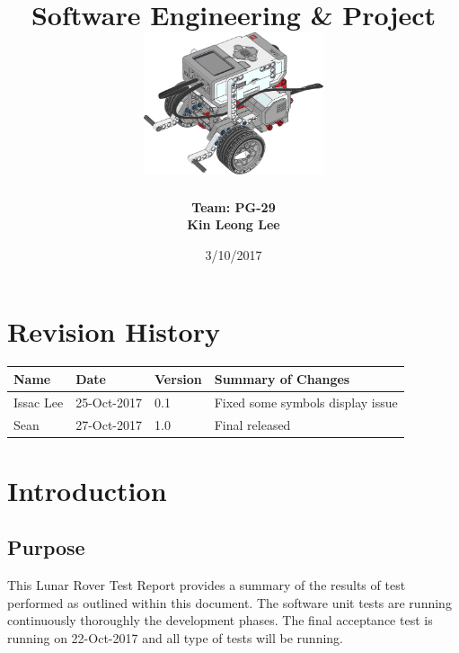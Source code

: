 \documentclass[10pt,a4paper,titlepage]{article}
\begin{document}
	
	\begin{titlepage}
		
		\title{
			\fontsize{50}{12}\\
			\vspace{20pt}
			\fontsize{20}{12}\\
			\vspace{10pt}
			\large{Software Engineering \& Project} \\
			\vspace{20pt}
			\includegraphics[width=200px]{title-page-ev3.png}					
		}
		\date{3/10/2017}
		\author{
			\bf{Team: PG-29} \\
			Kin Leong Lee \\
		}
		\maketitle
	\end{titlepage}
		 
	\tableofcontents	
	\listoftables
		
	\section*{Revision History}	
	\label{revtable}	
	\begin{tabular}{|p{2.1cm}|p{2.5cm}|p{2cm}|p{4.1cm}|}		
		\hline 
		\textbf {Name} & \textbf{Date} & \textbf {Version} &\textbf {Summary of Changes} \\ \hline
		Issac Lee & 25-Oct-2017 & 0.1 & Fixed some symbols display issue\\ \hline
		Sean & 27-Oct-2017 & 1.0 & Final released\\ \hline	
	\end{tabular}

	\newpage	
	\section{Introduction}
		\subsection{Purpose}
		This Lunar Rover Test Report provides a summary of the results of test performed as outlined within this document. The software unit tests are running continuously thoroughly the development phases. The final acceptance test is running on 22-Oct-2017 and all type of tests will be running.
	
\end{document}
